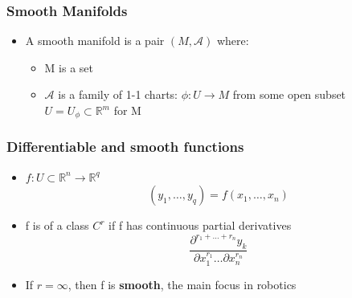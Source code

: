\documentclass[10pt]{beamer}
\newcommand{\myemph}[1]{{\usebeamercolor[fg]{emphprimary}
    \textbf{#1}}}
\begin{document}

\begin{frame}
  \frametitle{Smooth Manifolds}
  \begin{itemize}
  \item A smooth manifold is a pair $(M,\mathcal{A})$ where:
    \begin{itemize}
    \item M is a set
    \item $\mathcal{A}$ is a family of 1-1 charts:
      $\phi: U \rightarrow M$ from some open subset
      $U = U_{\phi} \subset \mathbb{R}^m$ for M
    \end{itemize}
  \end{itemize}
\end{frame}

\begin{frame}
  \frametitle{Differentiable and smooth functions}
  \begin{itemize}
  \item $f : U \subset \mathbb{R}^n \rightarrow \mathbb{R}^q$
    \[
      (y_1, \ldots, y_q ) = f(x_1,\ldots,x_n)
    \]
  \item f is of a class $C^r$ if f has continuous partial derivatives
    \[
      \frac{\partial^{r_1+\ldots+r_n}y_k}{\partial x_1^{r_1} \ldots \partial x_n^{r_n}}
    \]
  \item If $r=\infty$, then f is \myemph{smooth}, the main focus in robotics
  \end{itemize}
\end{frame}
\end{document}
